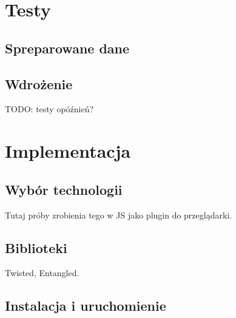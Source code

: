 \documentclass[a4paper,11pt]{scrartcl}
\begin{document}
\section{Testy}
\subsection{Spreparowane dane}


\subsection{Wdrożenie}
TODO: testy opóźnień?

\section{Implementacja}
\subsection{Wybór technologii}
Tutaj próby zrobienia tego w JS jako plugin do przeglądarki.
\subsection{Biblioteki}
Twisted, Entangled.
\subsection{Instalacja i uruchomienie}





\end{document}

